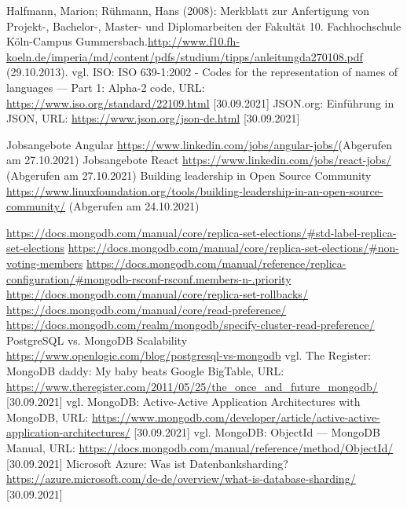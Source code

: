 \begin{thebibliography}{HR08}
 Halfmann, Marion; Rühmann, Hans (2008): Merkblatt zur Anfertigung von Projekt-, Bachelor-, Master- und Diplomarbeiten der Fakultät 10. Fachhochschule Köln-Campus Gummersbach.\url{http://www.f10.fh-koeln.de/imperia/md/content/pdfs/studium/tipps/anleitungda270108.pdf} (29.10.2013).
 vgl. ISO: ISO 639-1:2002 - Codes for the representation of names of languages — Part 1: Alpha-2 code, URL: \url{https://www.iso.org/standard/22109.html} [30.09.2021]
 JSON.org: Einführung in JSON, URL: \url{https://www.json.org/json-de.html} [30.09.2021]

 Jobsangebote Angular \url{https://www.linkedin.com/jobs/angular-jobs/}(Abgerufen am 27.10.2021)
 Jobsangebote React \url{https://www.linkedin.com/jobs/react-jobs/}  (Abgerufen am 27.10.2021)
Building leadership in Open Source Community \url{https://www.linuxfoundation.org/tools/building-leadership-in-an-open-source-community/} (Abgerufen am 24.10.2021)

 \url{https://docs.mongodb.com/manual/core/replica-set-elections/#std-label-replica-set-elections}
 \url{https://docs.mongodb.com/manual/core/replica-set-elections/#non-voting-members}
 \url{https://docs.mongodb.com/manual/reference/replica-configuration/#mongodb-rsconf-rsconf.members-n-.priority}
 \url{https://docs.mongodb.com/manual/core/replica-set-rollbacks/}
 \url{https://docs.mongodb.com/manual/core/read-preference/}
 \url{https://docs.mongodb.com/realm/mongodb/specify-cluster-read-preference/}
 PostgreSQL vs. MongoDB Scalability \url{https://www.openlogic.com/blog/postgresql-vs-mongodb}
 vgl. The Register: MongoDB daddy: My baby beats Google BigTable, URL: \url{https://www.theregister.com/2011/05/25/the_once_and_future_mongodb/} [30.09.2021]
 vgl. MongoDB: Active-Active Application Architectures with MongoDB, URL: \url{https://www.mongodb.com/developer/article/active-active-application-architectures/} [30.09.2021]
 vgl. MongoDB: ObjectId — MongoDB Manual, URL: \url{https://docs.mongodb.com/manual/reference/method/ObjectId/} [30.09.2021]
 Microsoft Azure: Was ist Datenbanksharding? \url{https://azure.microsoft.com/de-de/overview/what-is-database-sharding/} [30.09.2021]


\end{thebibliography}
